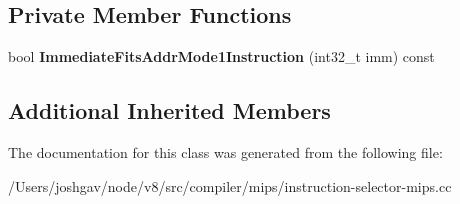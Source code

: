 \subsection*{Private Member Functions}
\begin{DoxyCompactItemize}
\item 
bool {\bfseries Immediate\+Fits\+Addr\+Mode1\+Instruction} (int32\+\_\+t imm) const \hypertarget{classv8_1_1internal_1_1compiler_1_1_mips_operand_generator_a46d61510aa75d7f384af6e0b7efb153d}{}\label{classv8_1_1internal_1_1compiler_1_1_mips_operand_generator_a46d61510aa75d7f384af6e0b7efb153d}

\end{DoxyCompactItemize}
\subsection*{Additional Inherited Members}


The documentation for this class was generated from the following file\+:\begin{DoxyCompactItemize}
\item 
/\+Users/joshgav/node/v8/src/compiler/mips/instruction-\/selector-\/mips.\+cc\end{DoxyCompactItemize}

